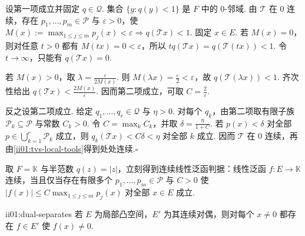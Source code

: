 \begin{FAProof}
设第一项成立并固定 \(\displaystyle q\in\mathcal Q\). 集合 \(\displaystyle \{y:q(y)<1\}\) 是 \(\displaystyle F\) 中的 \(\displaystyle0\)-邻域. 由 \(\displaystyle \mathcal T\) 在 \(\displaystyle0\) 连续，存在 \(\displaystyle p_1,\dots,p_m\in\mathcal P\) 与 \(\displaystyle \varepsilon>0\)，使
\(\displaystyle M(x):=\max_{1\leqslant j\leqslant m}p_j(x)<\varepsilon \Longrightarrow q(\mathcal Tx)<1.\)
固定 \(\displaystyle x\in E\). 若 \(\displaystyle M(x)=0\)，则对任意 \(\displaystyle t>0\) 都有 \(\displaystyle M(tx)=0<\varepsilon\)，所以 \(\displaystyle tq(\mathcal Tx)=q(\mathcal T(tx))<1\). 令 \(\displaystyle t\to\infty\)，只能有 \(\displaystyle q(\mathcal Tx)=0\).

若 \(\displaystyle M(x)>0\)，取 \(\displaystyle \lambda=\frac{\varepsilon}{2M(x)}\). 则 \(\displaystyle M(\lambda x)=\frac{\varepsilon}{2}<\varepsilon\)，故
\(\displaystyle q(\mathcal T(\lambda x))<1.\)
齐次性给出 \(\displaystyle q(\mathcal Tx)<\frac{2M(x)}{\varepsilon}\). 因而第二项成立，可取 \(\displaystyle C=\frac{2}{\varepsilon}\).

反之设第二项成立. 给定 \(\displaystyle q_1,\dots,q_r\in\mathcal Q\) 与 \(\displaystyle \eta>0\). 对每个 \(\displaystyle q_k\)，由第二项取有限子族 \(\displaystyle \mathcal P_k\subseteq\mathcal P\) 与常数 \(\displaystyle C_k>0\). 令 \(\displaystyle C=\max_kC_k\)，并取 \(\displaystyle \delta=\frac{\eta}{1+C}\). 若 \(\displaystyle p(x)<\delta\) 对全部 \(\displaystyle p\in\bigcup_{k=1}^r\mathcal P_k\) 成立，则 \(\displaystyle q_k(\mathcal Tx)<C\delta<\eta\) 对全部 \(\displaystyle k\) 成立. 因而 \(\displaystyle \mathcal T\) 在 \(\displaystyle0\) 连续，再由\autoref{ii01:tvs-local-tools}得到处处连续.\hfill\(\square\)
\end{FAProof}

取 \(\displaystyle F=\mathbb K\) 与半范数 \(\displaystyle q(z)=|z|\)，立刻得到连续线性泛函判据：线性泛函 \(\displaystyle f:E\to\mathbb K\) 连续，当且仅当存在有限多个 \(\displaystyle p_1,\dots,p_m\in\mathcal P\) 与 \(\displaystyle C>0\) 使
\(\displaystyle |f(x)| \leqslant C\max_{1\leqslant j\leqslant m}p_j(x)\)
对全部 \(\displaystyle x\in E\) 成立.

\begin{FAProposition}[B][连续对偶分离点]{ii01:dual-separates}
若 \(\displaystyle E\) 为局部凸空间，\(\displaystyle E'\) 为其连续对偶，则对每个 \(\displaystyle x\neq0\) 都存在 \(\displaystyle f\in E'\) 使 \(\displaystyle f(x)\neq0\).
\end{FAProposition}

